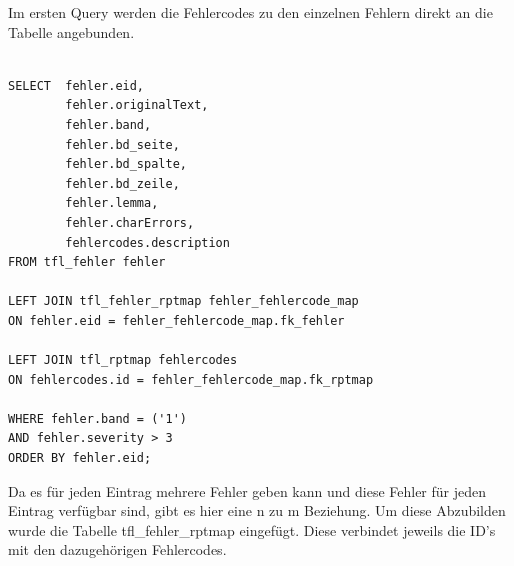 Im ersten Query werden die Fehlercodes zu den einzelnen Fehlern direkt an die Tabelle angebunden. 

\lstset{language=SQL}
\begin{lstlisting}[frame=single]  % Start your code-block

SELECT  fehler.eid,
        fehler.originalText,
        fehler.band,
        fehler.bd_seite,
        fehler.bd_spalte,
        fehler.bd_zeile,
        fehler.lemma,
        fehler.charErrors,
        fehlercodes.description
FROM tfl_fehler fehler

LEFT JOIN tfl_fehler_rptmap fehler_fehlercode_map 
ON fehler.eid = fehler_fehlercode_map.fk_fehler

LEFT JOIN tfl_rptmap fehlercodes 
ON fehlercodes.id = fehler_fehlercode_map.fk_rptmap

WHERE fehler.band = ('1')
AND fehler.severity > 3
ORDER BY fehler.eid;
\end{lstlisting}


Da es für jeden Eintrag mehrere Fehler geben kann und diese Fehler für jeden Eintrag verfügbar sind, gibt es hier eine n zu m Beziehung. Um diese Abzubilden wurde die Tabelle tfl\_fehler\_rptmap eingefügt. Diese verbindet jeweils die ID’s mit den dazugehörigen Fehlercodes. 